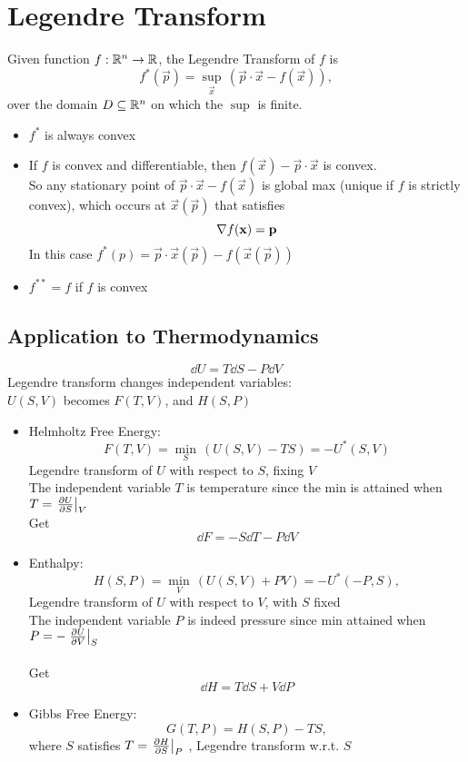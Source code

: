 \section{Legendre Transform}
Given function $f:\mathbb{R}^n \to \mathbb{R}$, the Legendre Transform of $f$ is \[f^*(\vec{p}) = \sup_{\vec{x}} \, (\vec{p}\cdot \vec{x} - f(\vec{x})), \] over the domain $D\subseteq \mathbb{R}^n$ on which the $\sup$ is finite.
\begin{itemize}
    \item $f^*$ is always convex
    \item If $f$ is convex and differentiable, then $f(\vec{x}) - \vec{p}\cdot \vec{x} $ is convex. \\
          So any stationary point of $\vec{p}\cdot \vec{x} - f(\vec{x})$ is global max (unique if $f$ is strictly convex), which occurs at $\vec{x}(\vec{p})$ that satisfies \[\mathbf{\nabla} f (\boldsymbol{\mathbf{x}}) = \boldsymbol{\mathbf{p}}\]
          In this case $f^*(p) = \vec{p}\cdot \vec{x}(\vec{p}) - f(\vec{x}(\vec{p}))$
    \item $f^{**} = f$ if $f$ is convex
\end{itemize}

\subsection*{Application to Thermodynamics}
\[\dd U = T \dd S - P \dd V\]
Legendre transform changes independent variables: \\
$U(S,V)$ becomes $F(T,V)$, and $H(S,P)$
\begin{itemize}
    \item Helmholtz Free Energy:
          \[F(T,V) = \min_S \, (U(S,V)-TS) = - U^*(S,V)\]
          Legendre transform of $U$ with respect to $S$, fixing $V$\\
          The independent variable $T$ is temperature since the min is attained when $T = \left. \frac{\partial{U}}{\partial{S}} \right|_V$\\
          Get \[\dd F = -S \dd T - P \dd V\]
    \item Enthalpy:
          \[H(S,P) = \min_V \, (U(S,V) + PV) = - U^*(-P,S),\] Legendre transform of $U$ with respect to $V$, with $S$ fixed\\
          The independent variable $P$ is indeed pressure since min attained when $P = -  \left. \frac{\partial{U}}{\partial{V}} \right|_S$ \\
          \\
          Get \[\dd H = T \dd S + V \dd P\]
    \item Gibbs Free Energy: \[G(T,P) = H(S,P) - TS, \] where $S$ satisfies $T = \left. \frac{\partial{H}}{\partial{S}} \right|_P$ , Legendre transform w.r.t. $S$

\end{itemize}

